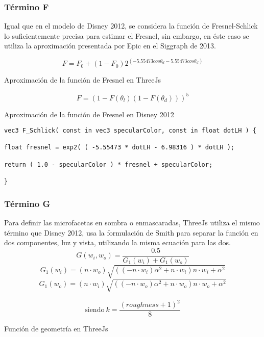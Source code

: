   \subsubsection{T\'ermino F}
  Igual que en el modelo de Disney 2012, se considera la funci\'on de Fresnel-Schlick lo suficientemente precisa para
  estimar el Fresnel, sin embargo, en \'este caso se utiliza la aproximaci\'on presentada por Epic en el Siggraph de 2013.\\

  \begin{eqfloat}
    \begin{equation}
      F= F_0 + (1 - F_0)2^{(-5.55473cos\theta_d - 5.55473cos\theta_d)}
    \end{equation}
  \caption{Aproximaci\'on de la funci\'on de Fresnel en ThreeJs}
  \end{eqfloat}

  \begin{eqfloat}[!htb]
    \begin{equation}
      F= (1 - F(\theta_l) (1 - F(\theta_d)))^5
    \end{equation}
  \caption{Aproximaci\'on de la funci\'on de Fresnel en Disney 2012}
  \end{eqfloat}

  \begin{lstlisting}[caption=Implementaci\'on en ThreeJs de la aproximaci\'on a la funci\'on de Fresnel]
vec3 F_Schlick( const in vec3 specularColor, const in float dotLH ) {

float fresnel = exp2( ( -5.55473 * dotLH - 6.98316 ) * dotLH );

return ( 1.0 - specularColor ) * fresnel + specularColor;

}
  \end{lstlisting}
  \newpage


  \subsubsection{T\'ermino G}
  Para definir las microfacetas en sombra o enmascaradas, ThreeJs utiliza el mismo t\'ermino que Disney 2012, usa
  la formulaci\'on de Smith para separar la funci\'on en dos componentes, luz y vista, utilizando la misma ecuaci\'on
  para las dos.\\

  $$
  G(w_i, w_o) = \frac{0.5}{G_1(w_i) + G_1(w_o)}
  $$
  \singlespacing
  $$
  G_1(w_i) = (n \cdot{w_o}) \sqrt{((-n\cdot{w_i}) \alpha^2 + n\cdot{w_i}) n\cdot{w_i} + \alpha^2}
  $$
  \singlespacing
  $$
  G_1(w_o) = (n \cdot{w_i}) \sqrt{((-n\cdot{w_o}) \alpha^2 + n\cdot{w_o}) n\cdot{w_o} + \alpha^2}
  $$
  \begin{eqfloat}[!htb]
    \begin{equation}
      \textrm{siendo}\ k = \frac{(roughness + 1)^2}{8}
    \end{equation}
  \caption{Funci\'on de geometr\'ia en ThreeJs}
  \end{eqfloat}
  \singlespacing

